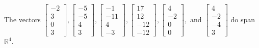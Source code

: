 \begin{exercise}
\begin{exerciseStatement}
  \end{exerciseStatement}
  \begin{exerciseAnswer}
   The vectors \(\left[\begin{array}{r}
-2 \\
3 \\
0 \\
3
\end{array}\right] , \left[\begin{array}{r}
-5 \\
-5 \\
4 \\
3
\end{array}\right] , \left[\begin{array}{r}
-1 \\
-11 \\
4 \\
-3
\end{array}\right] , \left[\begin{array}{r}
17 \\
12 \\
-12 \\
-12
\end{array}\right] , \left[\begin{array}{r}
4 \\
-2 \\
0 \\
0
\end{array}\right] , \text{ and } \left[\begin{array}{r}
4 \\
-2 \\
-4 \\
3
\end{array}\right]\) 
  	 do  
	span \(\mathbb{R}^4\).
  


  \end{exerciseAnswer}
\end{exercise}
